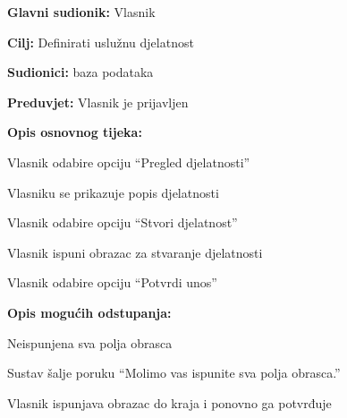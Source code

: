 			\begin{packed_item}
				\item \textbf{Glavni sudionik: } Vlasnik
				\item  \textbf{Cilj:} Definirati uslužnu djelatnost
				\item  \textbf{Sudionici:} baza podataka
				\item  \textbf{Preduvjet:} Vlasnik je prijavljen
				\item  \textbf{Opis osnovnog tijeka:}
				\item[] \begin{packed_enum}
					\item Vlasnik odabire opciju “Pregled djelatnosti”
					\item Vlasniku se prikazuje popis djelatnosti
					\item Vlasnik odabire opciju “Stvori djelatnost”
					\item Vlasnik ispuni obrazac za stvaranje djelatnosti
					\item Vlasnik odabire opciju “Potvrdi unos”
				\end{packed_enum}
				\item  \textbf{Opis mogućih odstupanja:}
				\item[] \begin{packed_item}
					\item[4.a] Neispunjena sva polja obrasca
					\item[] \begin{packed_enum}
						\item Sustav šalje poruku “Molimo vas ispunite sva polja obrasca.”
						\item Vlasnik ispunjava obrazac do kraja i ponovno ga potvrđuje
					\end{packed_enum}
				\end{packed_item}
			\end{packed_item}
